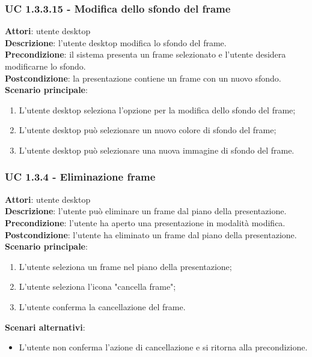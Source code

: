\subsubsection{UC 1.3.3.15 - Modifica dello sfondo del frame}{
	\label{uc1.3.3.15}
	\textbf{Attori}: utente desktop \\
	\textbf{Descrizione}: l'utente desktop modifica lo sfondo del frame. \\
	\textbf{Precondizione}: il sistema presenta un frame selezionato e l'utente desidera modificarne lo sfondo.	\\
	\textbf{Postcondizione}: la presentazione contiene un frame con un nuovo sfondo.	\\
	\textbf{Scenario principale}:
	\begin{enumerate}
		\item L'utente desktop seleziona l'opzione per la modifica dello sfondo del frame;
		\item L'utente desktop può selezionare un nuovo colore di sfondo del frame;
		\item L'utente desktop può selezionare una nuova immagine di sfondo del frame.
	\end{enumerate}
	}
\subsubsection{UC 1.3.4 - Eliminazione frame}{
	\label{uc1.3.4}
	\textbf{Attori}: utente desktop \\
	\textbf{Descrizione}: l'utente può eliminare un frame dal piano della presentazione. \\
	\textbf{Precondizione}: l'utente ha aperto una presentazione in modalità modifica.	\\
	\textbf{Postcondizione}: l'utente ha eliminato un frame dal piano della presentazione.	\\
	\textbf{Scenario principale}:
	\begin{enumerate}
		\item L'utente seleziona un frame nel piano della presentazione;
		\item L'utente seleziona l'icona "cancella frame";
		\item L'utente conferma la cancellazione del frame.
	\end{enumerate}
	\textbf{Scenari alternativi}: 
	\begin{itemize}
		\item L'utente non conferma l'azione di cancellazione e si ritorna alla precondizione.
	\end{itemize}
}
